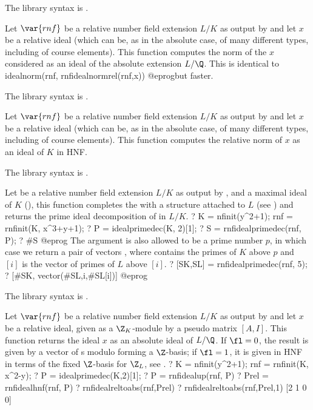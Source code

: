 The library syntax is .

\label{se:rnfidealnormabs}
Let $\var{rnf}$ be a relative
number field extension $L/K$ as output by  and let $x$ be a
relative ideal (which can be, as in the absolute case, of many different
types, including of course elements). This function computes the norm of the
$x$ considered as an ideal of the absolute extension $L/\Q$. This is
identical to
\bprog
   idealnorm(rnf, rnfidealnormrel(rnf,x))
@eprog\noindent but faster.

The library syntax is .

\label{se:rnfidealnormrel}
Let $\var{rnf}$ be a relative
number field extension $L/K$ as output by  and let $x$ be a
relative ideal (which can be, as in the absolute case, of many different
types, including of course elements). This function computes the relative
norm of $x$ as an ideal of $K$ in HNF.

The library syntax is .

\label{se:rnfidealprimedec}
Let  be a relative number
field extension $L/K$ as output by , and  a maximal
ideal of $K$ (), this function completes the 
with a  structure attached to $L$ (see )
and returns the prime ideal decomposition of  in $L/K$.
\bprog
? K = nfinit(y^2+1); rnf = rnfinit(K, x^3+y+1);
? P = idealprimedec(K, 2)[1];
? S = rnfidealprimedec(rnf, P);
? #S
@eprog
The argument  is also allowed to be a prime number $p$, in which
case we return a pair of vectors \kbd{[SK,SL]}, where  contains
the primes of $K$ above $p$ and $[i]$ is the vector of primes of $L$
above $[i]$.
\bprog
? [SK,SL] = rnfidealprimedec(rnf, 5);
? [#SK, vector(#SL,i,#SL[i])]
@eprog

The library syntax is .

\label{se:rnfidealreltoabs}
Let $\var{rnf}$ be a relative
number field extension $L/K$ as output by  and let $x$ be a
relative ideal, given as a $\Z_K$-module by a pseudo matrix $[A,I]$.
This function returns the ideal $x$ as an absolute ideal of $L/\Q$.
If $\fl = 0$, the result is given by a vector of s modulo
 forming a $\Z$-basis; if $\fl = 1$, it is given in HNF in terms
of the fixed $\Z$-basis for $\Z_L$, see .
\bprog
? K = nfinit(y^2+1); rnf = rnfinit(K, x^2-y);
? P = idealprimedec(K,2)[1];
? P = rnfidealup(rnf, P)
? Prel = rnfidealhnf(rnf, P)
? rnfidealreltoabs(rnf,Prel)
? rnfidealreltoabs(rnf,Prel,1)
[2 1 0 0]


